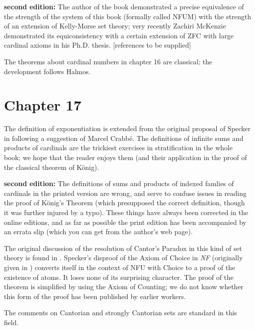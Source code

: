 {\bf second edition:}  The author of the book demonstrated a precise equivalence of the strength
of the system of this book (formally called NFUM) with the strength of an extension of Kelly-Morse set theory;
very recently Zachiri McKenzie demonstrated its equiconsistency with a certain extension of ZFC with large cardinal axioms in his Ph.D. thesis.  [references to be supplied]

The theorems about cardinal numbers in chapter 16 are classical; the
development follows Halmos.



\section*{Chapter 17}

The definition of exponentiation is extended
from the original proposal of Specker in \cite{specker} following a suggestion
of Marcel Crabb\'e.  The definitions of infinite sums and
products of cardinals 
are the trickiest exercises in stratification in the
whole book; we hope that the reader enjoys them (and their application in the
proof of the classical theorem of K\"onig).

{\bf second edition:}  The definitions of sums and products of indexed famlies of cardinals
in the printed version are wrong, and serve to confuse issues in reading the proof of K\"onig's Theorem (which presupposed the correct definition, though it was further injured by a typo).  These things have always been corrected in the online editions, and as far as possible the print edition has been accompanied by an errata slip (which you can get from the author's web page).

The original discussion of the resolution of Cantor's
Paradox in this 
kind of set theory is found in \cite{quine}.  
Specker's disproof of the Axiom of Choice in {\em NF\/} (originally 
given in \cite{specker}) converts itself in the context of
NFU 
with Choice to a proof of the existence of atoms.  It loses none
of its surprising character.  The proof of the theorem is simplified by 
using the Axiom of Counting; we do not know whether
this form of the proof has been published by earlier workers.

The comments on
Cantorian and strongly Cantorian sets are
standard in this field. 




